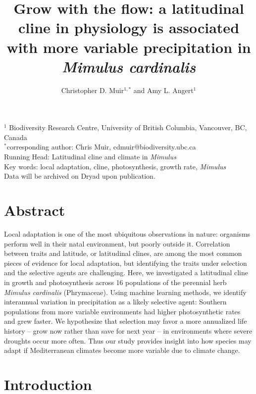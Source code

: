 \documentclass[11pt, oneside]{article}
\title{Grow with the flow: a latitudinal cline in physiology is associated with more variable precipitation in \textit{Mimulus cardinalis}}
\author{Christopher D. Muir$^{1,*}$ and Amy L. Angert$^1$}
\date{}
\newcommand{\stretchy}{1.5}
\begin{document}

\maketitle

$^1$ Biodiversity Research Centre, University of British Columbia, Vancouver, BC, Canada \\
$^*$corresponding author: Chris Muir, cdmuir@biodiversity.ubc.ca \\

Running Head: Latitudinal cline and climate in \textit{Mimulus} \\

Key words: local adaptation, cline, photosynthesis, growth rate, \textit{Mimulus} \\

Data will be archived on Dryad upon publication. \\

\clearpage


\setstretch{\stretchy}

\section*{Abstract}

Local adaptation is one of the most ubiquitous observations in nature: organisms perform well in their natal environment, but poorly outside it. Correlation between traits and latitude, or latitudinal clines, are among the most common pieces of evidence for local adaptation, but identifying the traits under selection and the selective agents are challenging. Here, we investigated a latitudinal cline in growth and photosynthesis across 16 populations of the perennial herb \textit{Mimulus cardinalis} (Phrymaceae). Using machine learning methods, we identify interannual variation in precipitation as a likely selective agent: Southern populations from more variable environments had higher photosynthetic rates and grew faster. We hypothesize that selection may favor a more annualized life history -- grow now rather than save for next year -- in environments where severe droughts occur more often. Thus our study provides insight into how species may adapt if Mediterranean climates become more variable due to climate change.

\section*{Introduction}
\end{document}
